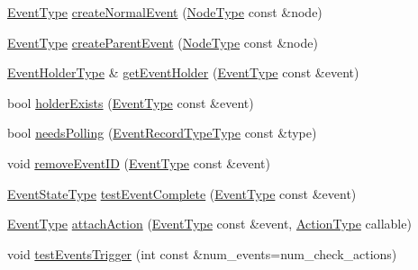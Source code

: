 \begin{DoxyCompactItemize}
\item 
\hyperlink{namespacevt_a009267401def7ae8bf201892222d060f}{Event\+Type} \hyperlink{structvt_1_1event_1_1_async_event_aa7c07c129ba54bde5abbe95c543ca352}{create\+Normal\+Event} (\hyperlink{namespacevt_a866da9d0efc19c0a1ce79e9e492f47e2}{Node\+Type} const \&node)
\item 
\hyperlink{namespacevt_a009267401def7ae8bf201892222d060f}{Event\+Type} \hyperlink{structvt_1_1event_1_1_async_event_a9646f211d660d2e991df07b77e5f2cc6}{create\+Parent\+Event} (\hyperlink{namespacevt_a866da9d0efc19c0a1ce79e9e492f47e2}{Node\+Type} const \&node)
\item 
\hyperlink{structvt_1_1event_1_1_async_event_a6b529d829ccb5b12c50c2b1978c41a86}{Event\+Holder\+Type} \& \hyperlink{structvt_1_1event_1_1_async_event_a27d14dba4b35f66aad75d46fb56227a9}{get\+Event\+Holder} (\hyperlink{namespacevt_a009267401def7ae8bf201892222d060f}{Event\+Type} const \&event)
\item 
bool \hyperlink{structvt_1_1event_1_1_async_event_a8aeeb83c7b467b3d130e522d079e5a7d}{holder\+Exists} (\hyperlink{namespacevt_a009267401def7ae8bf201892222d060f}{Event\+Type} const \&event)
\item 
bool \hyperlink{structvt_1_1event_1_1_async_event_a4d6056e47909a858fcd3bfc3782b8d2d}{needs\+Polling} (\hyperlink{namespacevt_1_1event_a1ea9fec44d101bf40b8fd786d44ebed9}{Event\+Record\+Type\+Type} const \&type)
\item 
void \hyperlink{structvt_1_1event_1_1_async_event_a67a603eff81f5f912118f38fd5cbaccb}{remove\+Event\+ID} (\hyperlink{namespacevt_a009267401def7ae8bf201892222d060f}{Event\+Type} const \&event)
\item 
\hyperlink{namespacevt_1_1event_a787aca6361696d96d817a639195c429c}{Event\+State\+Type} \hyperlink{structvt_1_1event_1_1_async_event_ac14b4e2fc658f70937c591dfdc8ea083}{test\+Event\+Complete} (\hyperlink{namespacevt_a009267401def7ae8bf201892222d060f}{Event\+Type} const \&event)
\item 
\hyperlink{namespacevt_a009267401def7ae8bf201892222d060f}{Event\+Type} \hyperlink{structvt_1_1event_1_1_async_event_aa6432e2fff56eb073f9489bfc37e89bc}{attach\+Action} (\hyperlink{namespacevt_a009267401def7ae8bf201892222d060f}{Event\+Type} const \&event, \hyperlink{namespacevt_ae0a5a7b18cc99d7b732cb4d44f46b0f3}{Action\+Type} callable)
\item 
void \hyperlink{structvt_1_1event_1_1_async_event_a383418f69041085a8c76b87c3bf82f27}{test\+Events\+Trigger} (int const \&num\+\_\+events=num\+\_\+check\+\_\+actions)

\end{DoxyCompactItemize}
